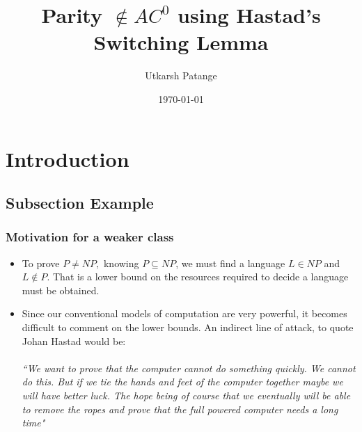\documentclass{beamer}[11pt]
\title[Proving the Switching Lemma]{Parity $\not\in AC^0$ using Hastad's Switching Lemma} %
\author{Utkarsh Patange} %
\institute[IIT-K] %
{
Indian Institute of Technology Kanpur \\ %
\medskip
}
\date{\today} %
\begin{document}
\begin{frame}
\titlepage %
\end{frame}


\section{Introduction} %

\subsection{Subsection Example} %

\begin{frame}
\frametitle{Motivation for a weaker class}
\begin{itemize}
\item To prove $P\neq NP,$ knowing $P \subseteq NP$, we must find a language $L\in NP$ and $L \not\in P$. That is a lower bound on the resources required to decide a language must be obtained.
\item Since our conventional models of computation are very powerful, it becomes difficult to comment on the lower bounds. An indirect line of attack, to quote Johan Hastad \cite{thesis} would be: 
\\~\\
\emph{``We want to prove that the computer cannot do something quickly.
We cannot do this. But if we tie the hands and feet of the computer
together maybe we will have better luck. The hope being of course that
we eventually will be able to remove the ropes and prove that the full
powered computer needs a long time"}

\end{itemize}
\end{frame}

\end{document}
